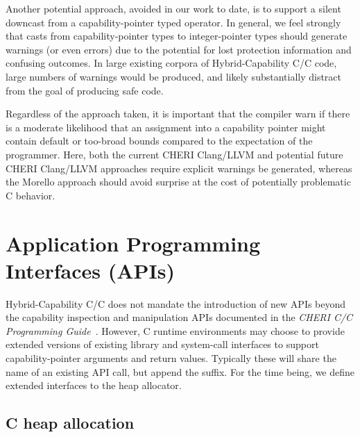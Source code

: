 \documentclass[12pt,twoside,openright,a4paper]{article}
\newcommand{\ccode}[1]{{\small\ttfamily{#1}}}
\newcommand{\note}[2]{{\color{blue}[ Note: #1 - #2]}}
\renewcommand{\note}[2]{\relax\ifhmode\unskip\fi}
\newcommand{\psnote}[1]{\note{#1}{Peter S.}}
\newcommand{\dcnote}[1]{\note{#1}{David}}
\newcommand*{\cpp}{\texorpdfstring{C\textsmaller[2]{\protect\nolinebreak[4]\hspace{-.05em}\raisebox{.45ex}{\textbf{++}}}}{C++}}
\newcommand*{\COrCpp}{C/\cpp{}}
\newcommand*{\purecapCOrCpp}{CHERI \COrCpp{}}
\newcommand*{\hybridCOrCpp}{Hybrid-Capability \COrCpp{}}
\begin{document}
Another potential approach, avoided in our work to date, is to support a
silent downcast from a capability-pointer typed \ccode{\&} operator.
In general, we feel strongly that casts from capability-pointer types to
integer-pointer types should generate warnings (or even errors) due to the
potential for lost protection information and confusing outcomes.
In large existing corpora of \hybridCOrCpp{} code, large numbers of warnings
would be produced,
\psnote{by what exactly? by having a silent downcast??}
and likely substantially distract from the goal of
producing safe code.

Regardless of the approach taken, it is important that the compiler warn if
there is a moderate likelihood that an assignment into a capability pointer
might contain default or too-broad bounds compared to the expectation of the
programmer.
Here, both the current CHERI Clang/LLVM and potential future CHERI Clang/LLVM
approaches require explicit warnings be generated, whereas the Morello
approach should avoid surprise at the cost of potentially problematic C
behavior.
\psnote{That last sentence is structured as an opposition -- but warnings and avoiding surprise seem consonant...}

\dcnote{This section is missing any description of C++ references.  I recall
that there were some fun corner cases here, for example if you have a
cap-pointer to an object (which may not be in DDC), what is the type of a
reference to that reference?}

\section{Application Programming Interfaces (APIs)}

\hybridCOrCpp{} does not mandate the introduction of new APIs beyond the
capability inspection and manipulation APIs documented in the
\textit{\purecapCOrCpp{} Programming Guide}~\cite{UCAM-CL-TR-947}.
However, C runtime environments may choose to provide extended versions of
existing library and system-call interfaces to support capability-pointer
arguments and return values.
Typically these will share the name of an existing API call, but append the
\ccode{\_c} suffix.
For the time being, we define extended interfaces to the heap allocator.

\subsection{C heap allocation}
\end{document}

